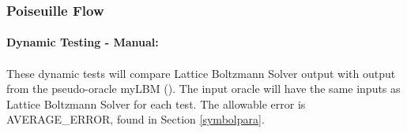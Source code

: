 \documentclass[12pt, titlepage]{article}
\newcommand{\famname}{Lattice Boltzmann Solver}
\begin{document}
\subsubsection{Poiseuille Flow}
\label{frpf}

\paragraph{Dynamic Testing - Manual:}
\paragraph{} These dynamic tests will compare {\famname} output with output from
the pseudo-oracle myLBM (\citet{pylbmcode}). The input oracle will have the same
inputs as {\famname} for each test. The allowable error is AVERAGE\_ERROR, found
in Section \ref{symbolpara}.
\end{document}
